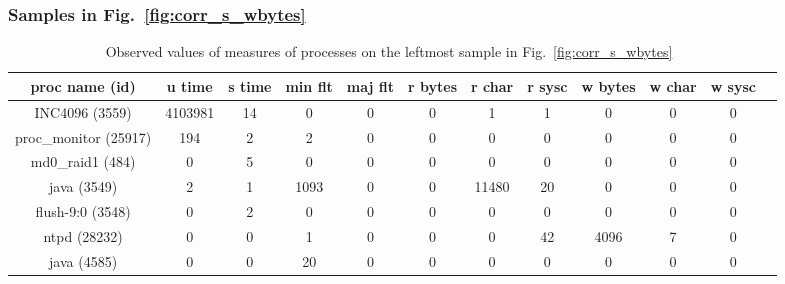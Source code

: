 \clearpage
\newpage

\subsubsection{Samples in Fig.~\ref{fig:corr_s_wbytes}}

\begin{table}[h]
\begin{center}
\begin{tabular}{|c|c|c|c|c|c|c|c|c|c|c|c|} \hline
proc name (id) & u time & s time & min flt & maj flt & r bytes & r char & r sysc & w bytes & w char & w sysc\\ \hline
INC4096 (3559) & 4103981 & 14 & 0 & 0 & 0 & 1 & 1 & 0 & 0 & 0 \\ \hline
proc\_monitor (25917) & 194 & 2 & 2 & 0 & 0 & 0 & 0 & 0 & 0 & 0 \\ \hline
md0\_raid1 (484) & 0 & 5 & 0 & 0 & 0 & 0 & 0 & 0 & 0 & 0 \\ \hline
java (3549) & 2 & 1 & 1093 & 0 & 0 & 11480 & 20 & 0 & 0 & 0 \\ \hline
flush-9:0 (3548) & 0 & 2 & 0 & 0 & 0 & 0 & 0 & 0 & 0 & 0 \\ \hline
ntpd (28232) & 0 & 0 & 1 & 0 & 0 & 0 & 42 & 4096 & 7 & 0 \\ \hline
java (4585) & 0 & 0 & 20 & 0 & 0 & 0 & 0 & 0 & 0 & 0 \\ \hline
\end{tabular}
\end{center}
\caption{Observed values of measures of processes on the leftmost sample in Fig.~\ref{fig:corr_s_wbytes}~\label{tab:breakdown4}}
\end{table}

